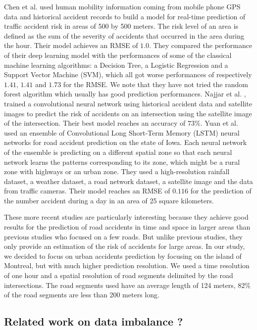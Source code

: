 \documentclass[conference]{IEEEtran}
\begin{document}
Chen et al. \cite{QChen2016} used human mobility information coming from mobile phone GPS data and historical accident records to build a model for real-time prediction of traffic accident risk in areas of 500 by 500 meters.
The risk level of an area is defined as the sum of the severity of accidents that occurred in the area during the hour.
Their model achieves an RMSE of $1.0$.
They compared the performance of their deep learning model with the performances of some of the classical machine learning algorithms: a Decision Tree, a Logistic Regression and a Support Vector Machine (SVM), which all got worse performances of respectively $1.41$, $1.41$ and $1.73$ for the RMSE.
We note that they have not tried the random forest algorithm which usually has good prediction performances.
Najjar et al. \cite{Najjar2017}, trained a convolutional neural network using historical accident data and satellite images to predict the risk of accidents on an intersection using the satellite image of the intersection.
Their best model reaches an accuracy of $73\%$.
Yuan et al. \cite{Yuan2018} used an ensemble of Convolutional Long Short-Term Memory (LSTM) neural networks for road accident prediction on the state of Iowa.
Each neural network of the ensemble is predicting on a different spatial zone so that each neural network learns the patterns corresponding to its zone, which might be a rural zone with highways or an urban zone.
They used a high-resolution rainfall dataset, a weather dataset, a road network dataset, a satellite image and the data from traffic cameras.
Their model reaches an RMSE of $0.116$ for the prediction of the number accident during a day in an area of 25 square kilometers.

These more recent studies are particularly interesting because they achieve good results for the prediction of road accidents in time and space in larger areas than previous studies who focused on a few roads. But unlike previous studies, they only provide an estimation of the risk of accidents for large areas. In our study, we decided to focus on urban accidents prediction by focusing on the island of Montreal, but with much higher prediction resolution. We used a time resolution of one hour and a spatial resolution of road segments delimited by the road intersections. The road segments used have an average length of 124 meters, $82\%$ of the road segments are less than 200 meters long.

\subsection{Related work on data imbalance ?}
\end{document}
